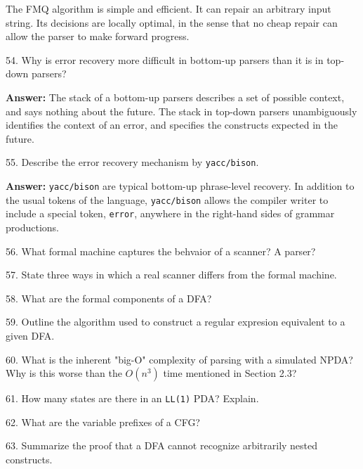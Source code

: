 The FMQ algorithm is simple and efficient. It can repair an arbitrary input string. Its decisions are locally optimal, in the sense that no cheap repair can allow the parser to make forward progress.


\filbreak
\vskip 1cm

54. Why is error recovery more difficult in bottom-up parsers than it is in top-down parsers?

\vskip 3mm
{\bf Answer:} The stack of a bottom-up parsers describes a set of possible context, and says nothing about the future. The stack in top-down parsers unambiguously identifies the context of an error, and specifies the constructs expected in the future.

\filbreak
\vskip 1cm

55. Describe the error recovery mechanism by {\tt yacc/bison}.

\vskip 3mm
{\bf Answer:} {\tt yacc/bison} are typical bottom-up phrase-level recovery. In addition to the usual tokens of the language, {\tt yacc/bison} allows the compiler writer to include a special token, {\tt error}, anywhere in the right-hand sides of grammar productions.

\filbreak
\vskip 1cm

56. What formal machine captures the behvaior of a scanner? A parser?

\filbreak
\vskip 1cm

57. State three ways in which a real scanner differs from the formal machine.

\filbreak
\vskip 1cm

58. What are the formal components of a DFA?

\filbreak
\vskip 1cm

59. Outline the algorithm used to construct a regular expresion equivalent to a given DFA.

\filbreak
\vskip 1cm

60. What is the inherent "big-O" complexity of parsing with a simulated NPDA? Why is this worse than the $O(n^3)$ time mentioned in Section 2.3?

\filbreak
\vskip 1cm

61. How many states are there in an {\tt LL(1)} PDA? Explain.

\filbreak
\vskip 1cm

62. What are the variable prefixes of a CFG?

\filbreak
\vskip 1cm

63. Summarize the proof that a DFA cannot recognize arbitrarily nested constructs.

